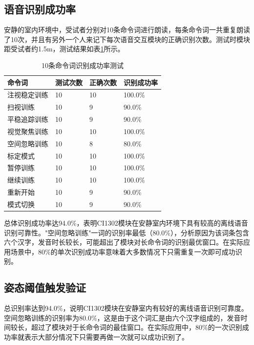 \subsection{语音识别成功率}

安静的室内环境中，受试者分别对10条命令词进行朗读，每条命令词一共重复朗读了10次，并且有另外一个人来记下每次语音交互模块的正确识别次数。测试时模块距受试者约1.5m，测试结果如表\ref{tab:voice_rate}所示。

\begin{table}[h!]
\centering
\caption{10条命令词识别成功率测试}
\label{tab:voice_rate}
\begin{tabular}{p{3.5cm} p{2cm} p{2cm} p{3.5cm}}
\toprule[1.5pt]
\textbf{命令词} & \textbf{测试次数} & \textbf{正确次数} & \textbf{识别成功率} \\
\midrule[1pt]
注视稳定训练   & 10 & 10 & 100.0\% \\
扫视训练       & 10 & 9  & 90.0\%  \\
平稳追踪训练   & 10 & 9  & 90.0\%  \\
视觉聚焦训练   & 10 & 10 & 100.0\% \\
空间忽略训练   & 10 & 8  & 80.0\%  \\
标定模式       & 10 & 10 & 100.0\% \\
暂停训练       & 10 & 10 & 100.0\% \\
继续训练       & 10 & 10 & 100.0\% \\
重新开始       & 10 & 9  & 90.0\%  \\
模式切换       & 10 & 9  & 90.0\%  \\
\bottomrule[1.5pt]
\end{tabular}
\end{table}

总体识别成功率达94.0\%，表明CI1302模块在安静室内环境下具有较高的离线语音识别可靠性。"空间忽略训练"一词的识别率最低（80.0\%），分析原因为该词条包含六个汉字，发音时长较长，可能超出了模块对长命令词的识别最优窗口。在实际应用场景中，80\%的单次识别成功率意味着大多数情况下只需重复一次即可成功识别。

\subsection{姿态阈值触发验证}

总识别率达到94.0\%，说明CI1302模块在安静室内有较好的离线语音识别可靠度。空间忽略训练的识别率为80.0\%，这是由于这个词汇是由六个汉字组成的，发音时间较长，超过了模块对于长命令词的最佳窗口。在实际应用中，80\%的一次识别成功率就表示大部分情况下只需要再做一次就可以成功识别了。

